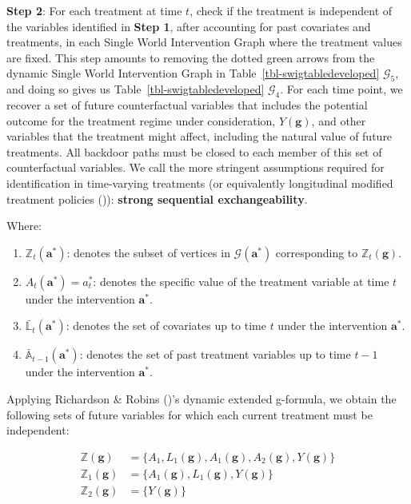 \documentclass[
  single column]{article}
\providecommand{\tightlist}{%
  \setlength{\itemsep}{0pt}\setlength{\parskip}{0pt}}\usepackage{longtable,booktabs,array}
\begin{document}
\textbf{Step 2}: For each treatment at time \(t\), check if the
treatment is independent of the variables identified in \textbf{Step 1},
after accounting for past covariates and treatments, in each Single
World Intervention Graph where the treatment values are fixed. This step
amounts to removing the dotted green arrows from the dynamic Single
World Intervention Graph in Table~\ref{tbl-swigtabledeveloped}
\(\mathcal{G}_5\), and doing so gives us
Table~\ref{tbl-swigtabledeveloped} \(\mathcal{G}_4\). For each time
point, we recover a set of future counterfactual variables that includes
the potential outcome for the treatment regime under consideration,
\(Y(\mathbf{g})\), and other variables that the treatment might affect,
including the natural value of future treatments. All backdoor paths
must be closed to each member of this set of counterfactual variables.
We call the more stringent assumptions required for identification in
time-varying treatments (or equivalently longitudinal modified treatment
policies ()):
\textbf{strong sequential exchangeability}.

Where:

\begin{enumerate}
\def\labelenumi{\arabic{enumi}.}
\tightlist
\item
  \textbf{\(\mathbb{Z}_t(\mathbf{a}^*)\)}: denotes the subset of
  vertices in \(\mathcal{G}(\mathbf{a}^*)\) corresponding to
  \(\mathbb{Z}_t(\mathbf{g})\).
\item
  \textbf{\(A_t(\mathbf{a}^*) = a^*_t\)}: denotes the specific value of
  the treatment variable at time \(t\) under the intervention
  \(\mathbf{a}^*\).
\item
  \textbf{\(\bar{\mathbb{L}}_t(\mathbf{a}^*)\)}: denotes the set of
  covariates up to time \(t\) under the intervention \(\mathbf{a}^*\).
\item
  \textbf{\(\bar{\mathbb{A}}_{t-1}(\mathbf{a}^*)\)}: denotes the set of
  past treatment variables up to time \(t-1\) under the intervention
  \(\mathbf{a}^*\).
\end{enumerate}

Applying Richardson \& Robins ()'s
dynamic extended g-formula, we obtain the following sets of future
variables for which each current treatment must be independent:

\[
\begin{aligned}
\mathbb{Z}(\mathbf{g}) &= \{A_1, L_1(\mathbf{g}), A_1(\mathbf{g}), A_2(\mathbf{g}), Y(\mathbf{g})\} \\
\mathbb{Z}_1(\mathbf{g}) &= \{A_1(\mathbf{g}), L_1(\mathbf{g}), Y(\mathbf{g})\} \\
\mathbb{Z}_2(\mathbf{g}) &= \{Y(\mathbf{g})\}
\end{aligned}
\]
\end{document}
